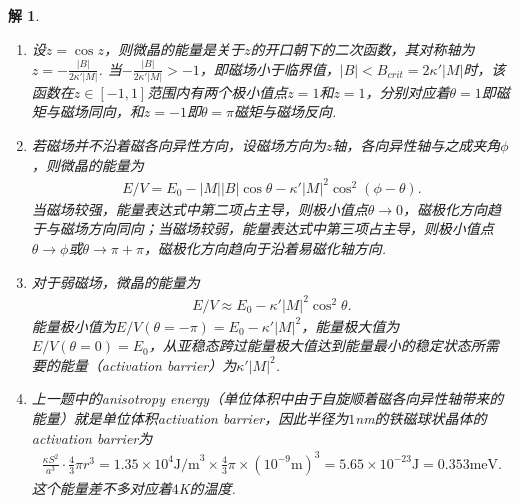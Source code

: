 \documentclass[UTF8,10pt,a4paper]{article}
\theoremstyle{Problem}
\theoremstyle{Solution}
\newtheorem*{sol}{解}
\providecommand{\abs}[1]{\left\lvert#1\right\rvert}
\begin{document}
\begin{sol}
    \begin{enumerate}
        \item[(a)] 设$z=\cos z$，则微晶的能量是关于$z$的开口朝下的二次函数，其对称轴为$z=-\frac{\abs{B}}{2\kappa'\abs{M}}$. 当$-\frac{\abs{B}}{2\kappa'\abs{M}}>-1$，即磁场小于临界值，$\abs{B}<B_{crit}=2\kappa'\abs{M}$时，该函数在$z\in[-1,1]$范围内有两个极小值点$z=1$和$z=1$，分别对应着$\theta=1$即磁矩与磁场同向，和$z=-1$即$\theta=\pi$磁矩与磁场反向.
        \item[(b)] 若磁场并不沿着磁各向异性方向，设磁场方向为$z$轴，各向异性轴与之成夹角$\phi$，则微晶的能量为
        \begin{align}
            E/V=E_0-\abs{M}\abs{B}\cos\theta-\kappa'\abs{M}^2\cos^2(\phi-\theta).
        \end{align}
        当磁场较强，能量表达式中第二项占主导，则极小值点$\theta\rightarrow 0$，磁极化方向趋于与磁场方向同向；当磁场较弱，能量表达式中第三项占主导，则极小值点$\theta\rightarrow\phi$或$\theta\rightarrow\pi+\pi$，磁极化方向趋向于沿着易磁化轴方向.
        \item[(c)] 对于弱磁场，微晶的能量为
        \begin{align}
            E/V\approx E_0-\kappa'\abs{M}^2\cos^2\theta.
        \end{align}
        能量极小值为$E/V(\theta=-\pi)=E_0-\kappa'\abs{M}^2$，能量极大值为$E/V(\theta=0)=E_0$，从亚稳态跨过能量极大值达到能量最小的稳定状态所需要的能量（activation barrier）为$\kappa'\abs{M}^2$.
        \item[(d)] 上一题中的anisotropy energy（单位体积中由于自旋顺着磁各向异性轴带来的能量）就是单位体积activation barrier，因此半径为$1$nm的铁磁球状晶体的activation barrier为
        \begin{align}
            \frac{\kappa S^2}{a^3}\cdot\frac{4}{3}\pi r^3=1.35\times 10^4\text{J/m}^3\times\frac{4}{3}\pi\times(10^{-9}\text{m})^3=5.65\times 10^{-23}\text{J}=0.353\text{meV}.
        \end{align}
        这个能量差不多对应着$4$K的温度.
    \end{enumerate}
\end{sol}
\end{document}
